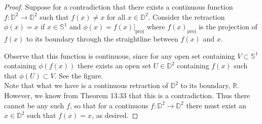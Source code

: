 \documentclass[a4paper,12pt,twoside]{hmcpset}
\begin{document}
\begin{proof}
    Suppose for a contradiction that there exists a continuous
    function $f: \mathbb{D}^2 \to \mathbb{D}^2$ such that $f(x) \ne x$
    for all $x \in \mathbb{D}^2$. Consider the retraction $\phi(x) =
    x$ if $x \in \mathbb{S}^1$ and $\phi(x) = f(x)|_\text{proj}$ where
    $f(x)_\text{proj}$ is the projection of $f(x)$ to its boundary
    through the straightline between $f(x)$ and $x$.
    \begin{figure}[h!]
        \centering        
    \end{figure}

    Observe that this function is continuous, since for any open set
    containing $V \subset \mathbb{S}^1$ containing $\phi(f(x))$ there
    exists an open set $U \in 
    \mathbb{D}^2$ containing $f(x)$ such that $\phi(U) \subset V$. See
    the figure. 
    \\

    Note that what we have is a continuous retraction of
    $\mathbb{D}^2$ to its boundary, $\mathbb{R}$. However, we know
    from Theorem 13.33 that this is a contradiction. Thus there cannot
    be any such $f$, so that for a continuous
    $f: \mathbb{D}^2 \to \mathbb{D}^2$ there must exist an $x \in
    \mathbb{D}^2$ such that $f(x) = x$, as desired.


\end{proof}
\end{document}
